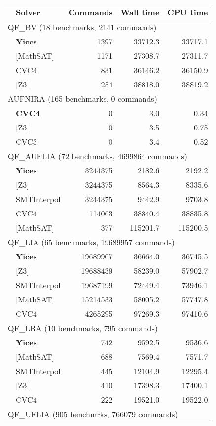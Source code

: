 \begin{tabular}{|p{.1in}l|rrr|}
\hline
 & Solver & Commands & Wall time & CPU time \\
\hline
\multicolumn{5}{|l|}{QF\_BV (18 benchmarks, 2141 commands)} \\
& \textbf{Yices} & 1397 & 33712.3 & 33717.1 \\
& [MathSAT] & 1171 & 27308.7 & 27311.7 \\
& CVC4 & 831 & 36146.2 & 36150.9 \\
& [Z3] & 254 & 38818.0 & 38819.2 \\
\hline
\multicolumn{5}{|l|}{AUFNIRA (165 benchmarks, 0 commands)} \\
& \textbf{CVC4} & 0 & 3.0 & 0.34 \\
& [Z3] & 0 & 3.5 & 0.75 \\
& CVC3 & 0 & 3.4 & 0.52 \\
\hline
\multicolumn{5}{|l|}{QF\_AUFLIA (72 benchmarks, 4699864 commands)} \\
& \textbf{Yices} & 3244375 & 2182.6 & 2192.2 \\
& [Z3] & 3244375 & 8564.3 & 8335.6 \\
& SMTInterpol & 3244375 & 9442.9 & 9703.8 \\
& CVC4 & 114063 & 38840.4 & 38835.8 \\
& [MathSAT] & 377 & 115201.7 & 115200.5 \\
\hline
\multicolumn{5}{|l|}{QF\_LIA (65 benchmarks, 19689957 commands)} \\
& \textbf{Yices} & 19689907 & 36664.0 & 36745.5 \\
& [Z3] & 19688439 & 58239.0 & 57902.7 \\
& SMTInterpol & 19687199 & 72449.4 & 73946.1 \\
& [MathSAT] & 15214533 & 58005.2 & 57747.8 \\
& CVC4 & 4265295 & 97269.3 & 97410.6 \\
\hline
\multicolumn{5}{|l|}{QF\_LRA (10 benchmarks, 795 commands)} \\
& \textbf{Yices} & 742 & 9592.5 & 9536.6 \\
& [MathSAT] & 688 & 7569.4 & 7571.7 \\
& SMTInterpol & 445 & 12104.9 & 12295.4 \\
& [Z3] & 410 & 17398.3 & 17400.1 \\
& CVC4 & 222 & 19521.0 & 19522.0 \\
\hline
\multicolumn{5}{|l|}{QF\_UFLIA (905 benchmrks, 766079 commands)} \\

\end{tabular}

